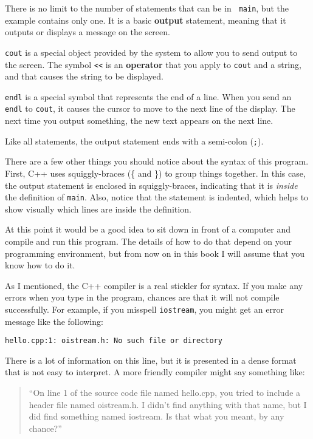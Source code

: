
There is no limit to the number of statements that can be in {\tt
main}, but the example contains only one.  It is a basic {\bf
output} statement, meaning that it outputs or displays a message on
the screen.  

{\tt cout} is a special object provided by the system to allow
you to send output to the screen.  The symbol {\tt <<} is an
{\bf operator} that you apply to {\tt cout} and a string, and that
causes the string to be displayed.


{\tt endl} is a special symbol that represents the end of a
line.  When you send an {\tt endl} to {\tt cout}, it causes the
cursor to move to the next line of the display.
The next time you output something, the new text appears
on the next line.

Like all statements, the output statement ends with a
semi-colon ({\tt ;}).

There are a few other things you should notice about the syntax of
this program.  First, C++ uses squiggly-braces (\{ and
\}) to group things together.  In this case, the output statement
is enclosed in squiggly-braces, indicating that it is {\em inside} the
definition of {\tt main}.  Also, notice that the statement is
indented, which helps to show visually which lines are inside the
definition.

At this point it would be a good idea to sit down in front of
a computer and compile and run this program.  The details of how
to do that depend on your programming environment, but from now
on in this book I will assume that you know how to do it.

As I mentioned, the C++ compiler is a real stickler for syntax.
If you make any errors when you type in the program, chances
are that it will not compile successfully.  For example, if
you misspell {\tt iostream}, you might get an error message like
the following:

\begin{verbatim}
hello.cpp:1: oistream.h: No such file or directory
\end{verbatim}
%
There is a lot of information on this line, but it is presented
in a dense format that is not easy to interpret.  A more friendly
compiler might say something like:

\begin{quote}
``On line 1 of the source code file named hello.cpp, you tried to
include a header file named oistream.h.  I didn't find anything
with that name, but I did find something named iostream.  Is
that what you meant, by any chance?''
\end{quote}

